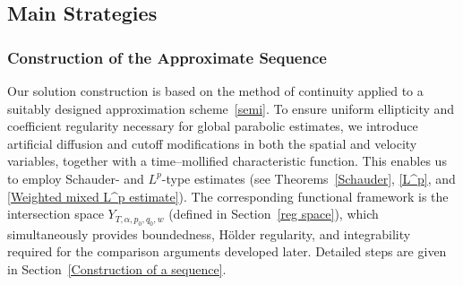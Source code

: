 \documentclass[reqno,11pt,final]{amsart}
\theoremstyle{plain}
\newtheorem{remark}[theorem]{Remark}
\numberwithin{equation}{section}
\numberwithin{theorem}{section}
\begin{document}

\subsection{Main Strategies}

\subsubsection{Construction of the Approximate Sequence}
Our solution construction is based on the method of continuity applied to a suitably designed approximation scheme~\eqref{semi}. To ensure uniform ellipticity and coefficient regularity necessary for global parabolic estimates, we introduce artificial diffusion and cutoff modifications in both the spatial and velocity variables, together with a time–mollified characteristic function. This enables us to employ Schauder- and $L^p$-type estimates (see Theorems~\ref{Schauder}, \ref{L^p}, and \ref{Weighted mixed L^p estimate}). The corresponding functional framework is the intersection space $Y_{T,\alpha,p_0,q_0,w}$ (defined in Section~\ref{reg space}), which simultaneously provides boundedness, Hölder regularity, and integrability required for the comparison arguments developed later. Detailed steps are given in Section~\ref{Construction of a sequence}.
\end{document}
